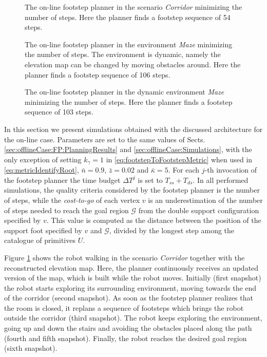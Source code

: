 \begin{figure}
    \OnlineCorridor
    \caption{The on-line footstep planner in the scenario \textit{Corridor} minimizing the number of steps. Here the planner finds a footstep sequence of 54 steps.}
    \label{fig:onlineCase:Corridor:Simulation}
\end{figure}
\begin{figure}
    \OnlineMazeDynamic
    \caption{The on-line footstep planner in the environment \textit{Maze} minimizing the number of steps. The environment is dynamic, namely the elevation map can be changed by moving obstacles around. Here the planner finds a footstep sequence of 106 steps.}
    \label{fig:onlineCase:MazeDynamic:Simulation}
\end{figure}
\begin{figure}
    \OnlineMazeStopandgo
    \caption{The on-line footstep planner in the dynamic environment \textit{Maze} minimizing the number of steps. Here the planner finds a footstep sequence of 103 steps.}
    \label{fig:onlineCase:MazeStopAndGo:Simulation}
\end{figure}

In this section we present simulations obtained with the discussed architecture for the on-line case. Parameters are set to the same values of Sects. \ref{sec:offlineCase:FP:PlanningResults} and \ref{sec:offlineCase:Simulations}, with the only exception of setting $k_\gamma = 1$ in \eqref{eq:footstepToFootstepMetric} when used in \eqref{eq:metricIdentifyRoot}, $\bar{n}=0.9$, $\bar{z}=0.02$ and ${\bar{\kappa}}=5$. For each $j$-th invocation of the footstep planner the time budget $\Delta T^j$ is set to $T_{ss}+T_{ds}$. In all performed simulations, the quality criteria considered by the footstep planner is the number of steps, while the \textit{cost-to-go} of each vertex $v$ is an underestimation of the number of steps needed to reach the goal region $\mathcal{G}$ from the double support configuration specified by $v$. This value is computed as the distance between the position of the support foot specified by $v$ and $\mathcal{G}$, divided by the longest step among the catalogue of primitives $U$. 

Figure \ref{fig:onlineCase:Corridor:Simulation} shows the robot walking in the scenario \textit{Corridor} together with the reconstructed elevation map. Here, the planner continuously receives an updated version of the map, which is built while the robot moves. Initially (first snapshot) the robot starts exploring its surrounding environment, moving towards the end of the corridor (second snapshot). As soon as the footstep planner realizes that the room is closed, it replans a sequence of footsteps which brings the robot outside the corridor (third snapshot). The robot keeps exploring the environment, going up and down the stairs and avoiding the obstacles placed along the path (fourth and fifth snapshot). Finally, the robot reaches the desired goal region (sixth snapshot).

